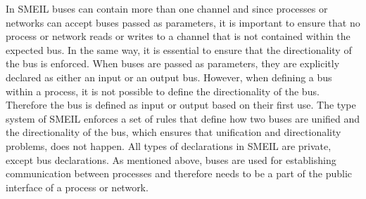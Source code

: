 In SMEIL buses can contain more than one channel and since processes or networks can accept buses passed as parameters, it is important to ensure that no process or network reads or writes to a channel that is not contained within the expected bus.
In the same way, it is essential to ensure that the directionality of the bus is enforced. When buses are passed as parameters, they are explicitly declared as either an input or an output bus. However, when defining a bus within a process, it is not possible to define the directionality of the bus. Therefore the bus is defined as input or output based on their first use.
The type system of SMEIL enforces a set of rules that define how two buses are unified and the directionality of the bus, which ensures that unification and directionality problems, does not happen.
All types of declarations in SMEIL are private, except bus declarations. As mentioned above, buses are used for establishing communication between processes and therefore needs to be a part of the public interface of a process or network.

